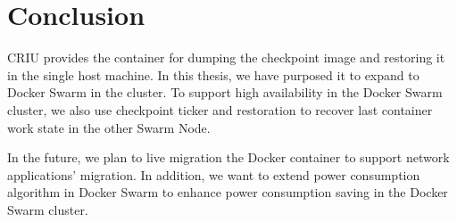 \chapter{Conclusion}
\label{chap:conclusion}
CRIU provides the container for dumping the checkpoint image and restoring it in the single host machine. In this thesis, we have purposed it to expand to Docker Swarm in the cluster. To support high availability in the Docker Swarm cluster, we also use checkpoint ticker and restoration to recover last container work state in the other Swarm Node.

In the future, we plan to live migration the Docker container to support network applications' migration. In addition, we want to extend power consumption algorithm in Docker Swarm to enhance power consumption saving in the Docker Swarm cluster.